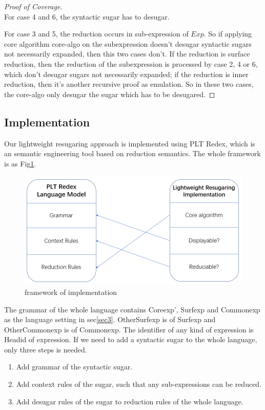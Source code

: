 \begin{proof}[Proof of Coverage]
\hfill\\
For case 4 and 6, the syntactic sugar has to desugar.

For case 3 and 5, the reduction occurs in sub-expression of $Exp$. So if applying core algorithm core-algo on the subexpression doesn't desugar syntactic sugars not necessarily expanded, then this two cases don't. If the reduction is surface reduction, then the reduction of the subexpression is processed by case 2, 4 or 6, which don't desugar sugars not necessarily expanded; if the reduction is inner reduction, then it's another recursive proof as emulation. So in these two cases, the core-algo only desugar the sugar which has to be desugared.
\end{proof}

\subsection{Implementation}

Our lightweight resugaring approach  is implemented using PLT Redex\cite{SEwPR}, which is an semantic engineering tool based on reduction semantics\cite{reduction}. The whole framework is as Fig\ref{fig:frame}.

\begin{figure}[h]
	\centering
	\includegraphics[width=12cm]{images/frame.png}
	\caption{framework of implementation}
	\label{fig:frame}
\end{figure}

The grammar of the whole language contains Coreexp', Surfexp and Commonexp as the language setting in sec\ref{sec3}. OtherSurfexp is of Surfexp and OtherCommonexp is of Commonexp. The identifier of any kind of expression is Headid of expression. If we need to add a syntactic sugar to the whole language, only three steps is needed.

\begin{enumerate}
\item Add grammar of the syntactic sugar.
\item Add context rules of the sugar, such that any sub-expressions can be reduced.
\item Add desugar rules of the sugar to reduction rules of the whole language.
\end{enumerate}

